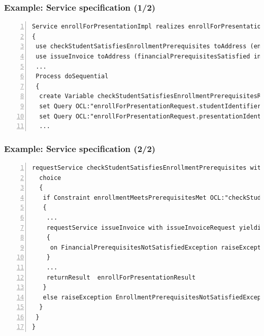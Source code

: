 \begin{frame}[fragile]
\frametitle{Example: Service specification (1/2)}

\lstset{language=urdad,label=serviceTextSyntax}
\begin{lstlisting}[numbers=left,escapechar=|]
Service enrollForPresentationImpl realizes enrollForPresentation receiving Variable enrollForPresentationRequest ofType EnrollForPresentationRequest
{
 use checkStudentSatisfiesEnrollmentPrerequisites toAddress (enrollmentPrerequisitesMet)
 use issueInvoice toAddress (financialPrerequisitesSatisfied invoiceIssued) 
 ...
 Process doSequential
 {
  create Variable checkStudentSatisfiesEnrollmentPrerequisitesRequest ofType CheckStudentSatisfiesEnrollmentPrerequisitesRequest               
  set Query OCL:"enrollForPresentationRequest.studentIdentifier" equalTo Query OCL:"checkEnrollmentPrerequisitesRequest.studentIdentifier"
  set Query OCL:"enrollForPresentationRequest.presentationIdentifier" equalTo Query OCL:"checkEnrollmentPrerequisitesRequest.presentationIdentifier"
  ...
\end{lstlisting}
\end{frame}
                   

\begin{frame}[fragile]
\frametitle{Example: Service specification (2/2)}
\lstset{language=urdad,label=serviceTextSyntax2}
\begin{lstlisting}[numbers=left,escapechar=|]
  requestService checkStudentSatisfiesEnrollmentPrerequisites with checkStudentSatisfiesEnrollmentPrerequisitesRequest yielding Variable checkStudentSatisfiesEnrollmentPrerequisitesResult ofType CheckStudentSatisfiesEnrollmentPrerequisitesResult
  choice
  {
   if Constraint enrollmentMeetsPrerequisitesMet OCL:"checkStudentSatisfiesEnrollmentPrerequisitesResult.enrollmentPrerequisitesMet = true" doSequential
   {
    ...
    requestService issueInvoice with issueInvoiceRequest yielding Variable issueInvoiceResult ofType IssueInvoiceResult
    {
     on FinancialPrerequisitesNotSatisfiedException raiseException FinancialPrerequisitesNotSatisfiedException
    }
    ...
    returnResult  enrollForPresentationResult
   }
   else raiseException EnrollmentPrerequisitesNotSatisfiedException
  }
 }
}                 
\end{lstlisting}
\end{frame}


